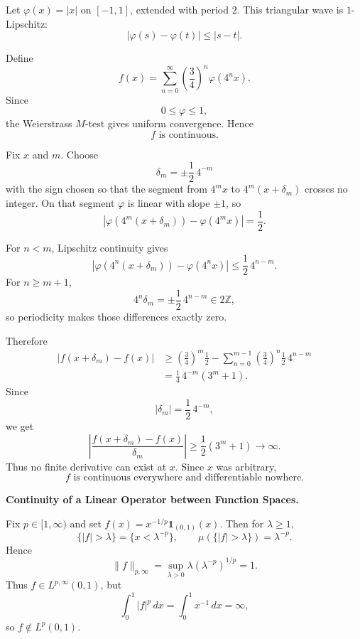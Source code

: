 \begin{solution}
Let \(\varphi(x)=|x|\) on \([-1,1]\), extended with period \(2\). This triangular wave is
\(1\)-Lipschitz:
\[
|\varphi(s)-\varphi(t)|
\le
|s-t|.
\]

Define
\[
f(x)
=
\sum_{n=0}^{\infty}
\left(\frac34\right)^n
\varphi(4^nx).
\]
Since
\[
0\le\varphi\le1,
\]
the Weierstrass \(M\)-test gives uniform convergence. Hence
\[
\boxed{f\text{ is continuous}.}
\]

Fix \(x\) and \(m\). Choose
\[
\delta_m
=
\pm\frac12\,4^{-m}
\]
with the sign chosen so that the segment from \(4^mx\) to
\(4^m(x+\delta_m)\) crosses no integer. On that segment \(\varphi\) is linear with slope
\(\pm1\), so
\[
\left|
\varphi(4^m(x+\delta_m))
-
\varphi(4^mx)
\right|
=
\frac12.
\]

For \(n<m\), Lipschitz continuity gives
\[
\left|
\varphi(4^n(x+\delta_m))
-
\varphi(4^nx)
\right|
\le
\frac12\,4^{n-m}.
\]
For \(n\ge m+1\),
\[
4^n\delta_m
=
\pm\frac12\,4^{n-m}
\in2\mathbb Z,
\]
so periodicity makes those differences exactly zero.

Therefore
\[
\begin{aligned}
|f(x+\delta_m)-f(x)|
&\ge
\left(\frac34\right)^m\frac12
-
\sum_{n=0}^{m-1}
\left(\frac34\right)^n
\frac12\,4^{n-m}\\
&=
\frac14\,4^{-m}(3^m+1).
\end{aligned}
\]
Since
\[
|\delta_m|
=
\frac12\,4^{-m},
\]
we get
\[
\left|
\frac{f(x+\delta_m)-f(x)}{\delta_m}
\right|
\ge
\frac12(3^m+1)
\longrightarrow\infty.
\]
Thus no finite derivative can exist at \(x\). Since \(x\) was arbitrary,
\[
\boxed{
f\text{ is continuous everywhere and differentiable nowhere}.
}
\]
\end{solution}


\begin{problem}[CP-II-0566]
\label{prob:cp-ii-0566}
\textbf{Continuity of a Linear Operator between Function Spaces.}

\hspace*{1.5em}Fix $p\in[1,\infty)$ and set $f(x)=x^{-1/p}\mathbf{1}_{(0,1)}(x)$.
	Then for $\lambda\ge 1$,
	\[
	\{|f|>\lambda\}=\{x<\lambda^{-p}\},\qquad
	\mu(\{|f|>\lambda\})=\lambda^{-p}.
	\]
	Hence
	\[
	\|f\|_{p,\infty}
	=\sup_{\lambda>0}\lambda(\lambda^{-p})^{1/p}=1.
	\]
	Thus $f\in L^{p,\infty}(0,1)$, but
	\[
	\int_0^1 |f|^p\,dx
	= \int_0^1 x^{-1}\,dx = \infty,
	\]
	so $f\notin L^p(0,1)$.
\end{problem}

